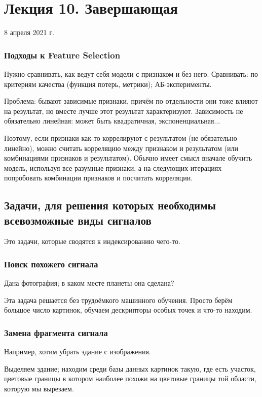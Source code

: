 \documentclass[main.tex]{subfiles}
\begin{document}
\section{ Лекция 10. Завершающая }
8 апреля 2021 г.

\subsubsection{Подходы к Feature Selection}

Нужно сравнивать, как ведут себя модели  с признаком и без него.
Сравнивать: по критериям качества (функция потерь, метрики); АБ-эксперименты.

Проблема: бывают зависимые признаки, причём по отдельности они тоже влияют на результат, но вместе лучше этот результат характеризуют.
Зависимость не обязательно линейная: может быть квадратичная, экспоненциальная...

Поэтому, если признаки как-то коррелируют с результатом (не обязательно линейно), можно считать корреляцию между признаком и результатом (или комбинациями признаков и результатом).
Обычно имеет смысл вначале обучить модель, используя все разумные признаки, а на следующих итерациях попробовать комбинации признаков и посчитать корреляции.

\subsection{ Задачи, для решения которых необходимы всевозможные виды сигналов }

Это задачи, которые сводятся к индексированию чего-то.

\subsubsection{ Поиск похожего сигнала }

Дана фотография; в каком месте планеты она сделана?

Эта задача решается без трудоёмкого машинного обучения.
Просто берём большое число картинок, обучаем дескрипторы особых точек и что-то находим.

\subsubsection{ Замена фрагмента сигнала }

Например, хотим убрать здание с изображения.

Выделяем здание; находим среди базы данных картинок такую, где есть участок, цветовые границы в котором наиболее похожи на цветовые границы той области, которую мы вырезаем.
\end{document}
